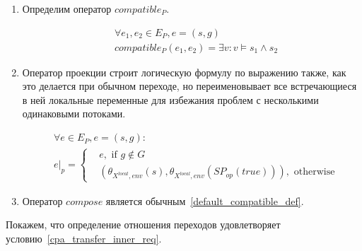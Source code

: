 \begin{enumerate}
\item 
Определим оператор $compatible_P$.

\begin{equation}
\label{cpa_predicate_compatible}
\begin{aligned}
& \forall e_1, e_2 \in E_P, e = (s, g) \\
& compatible_{P}(e_1, e_2) = \exists v: v \models s_1 \land s_2
\end{aligned}
\end{equation}

\item Оператор проекции строит логическую формулу по выражению также, как это делается при обычном переходе, но переименовывает все встречающиеся в ней локальные переменные для избежания проблем с несколькими одинаковыми потоками.

\begin{equation}
\begin{aligned}
& \forall e \in E_P, e =(s,g): \\
& e|_p = 
\begin{cases}
&e, \mbox{ if } g \notin G\\
&(\theta_{X^{local},env}(s),\theta_{X^{local},env}(SP_{op}(true))), \mbox{ otherwise}
\end{cases}
\end{aligned}
\end{equation}

\item Оператор $compose$ является обычным~\ref{default_compatible_def}.

\end{enumerate}

Покажем, что определение отношения переходов удовлетворяет условию~\ref{cpa_transfer_inner_req}. 

